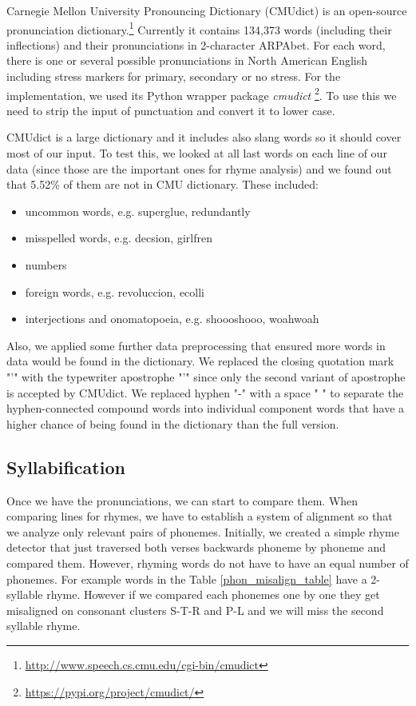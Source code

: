 Carnegie Mellon University Pronouncing Dictionary (CMUdict) is an open-source pronunciation dictionary.\footnote{\url{http://www.speech.cs.cmu.edu/cgi-bin/cmudict}} Currently it contains 134,373 words (including their inflections) and their pronunciations in 2-character ARPAbet. 
For each word, there is one or several possible pronunciations in North American English including stress markers for primary, secondary or no stress. For the implementation, we used its Python wrapper package \textit{cmudict} \footnote{\url{https://pypi.org/project/cmudict/}}. To use this we need to strip the input of punctuation and convert it to lower case.

CMUdict is a large dictionary and it includes also slang words so it should cover most of our input. To test this, we looked at all last words on each line of our data (since those are the important ones for rhyme analysis) and we found out that 5.52\% of them are not in CMU dictionary. These included:

\begin{itemize}
	\item uncommon words, e.g. superglue, redundantly
	\item misspelled words, e.g. decsion, girlfren
	\item numbers
	\item foreign words, e.g. revoluccion, ecolli
	\item interjections and onomatopoeia, e.g. shoooshooo, woahwoah
\end{itemize}

Also, we applied some further data preprocessing that ensured more words in data would be found in the dictionary. We replaced the closing quotation mark "’" with the typewriter apostrophe "'" since only the second variant of apostrophe is accepted by CMUdict. We replaced hyphen "-" with a space " " to separate the hyphen-connected compound words into individual component words that have a higher chance of being found in the dictionary than the full version.

\subsection{Syllabification}
Once we have the pronunciations, we can start to compare them. When comparing lines for rhymes, we have to establish a system of alignment so that we analyze only relevant pairs of phonemes. Initially, we created a simple rhyme detector that just traversed both verses backwards phoneme by phoneme and compared them. However, rhyming words do not have to have an equal number of phonemes. For example words in the Table \ref{phon_misalign_table} have a 2-syllable rhyme. However if we compared each phonemes one by one they get misaligned on consonant clusters S-T-R and P-L and we will miss the second syllable rhyme.


